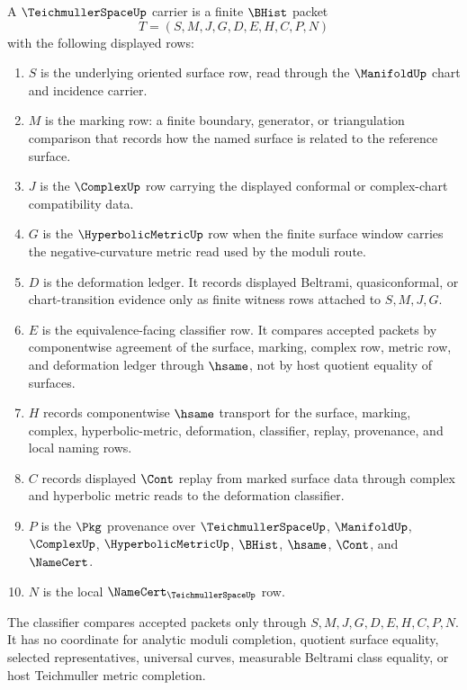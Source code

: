 \begin{definition}
\label{def:teichmuller-space-carrier}
A $\TeichmullerSpaceUp$ carrier is a finite $\BHist$ packet
$$
T=(S,M,J,G,D,E,H,C,P,N)
$$
with the following displayed rows:
\begin{enumerate}
\item $S$ is the underlying oriented surface row, read through the $\ManifoldUp$ chart and incidence carrier.
\item $M$ is the marking row: a finite boundary, generator, or triangulation comparison that records how the named surface is related to the reference surface.
\item $J$ is the $\ComplexUp$ row carrying the displayed conformal or complex-chart compatibility data.
\item $G$ is the $\HyperbolicMetricUp$ row when the finite surface window carries the negative-curvature metric read used by the moduli route.
\item $D$ is the deformation ledger. It records displayed Beltrami, quasiconformal, or chart-transition evidence only as finite witness rows attached to $S,M,J,G$.
\item $E$ is the equivalence-facing classifier row. It compares accepted packets by componentwise agreement of the surface, marking, complex row, metric row, and deformation ledger through $\hsame$, not by host quotient equality of surfaces.
\item $H$ records componentwise $\hsame$ transport for the surface, marking, complex, hyperbolic-metric, deformation, classifier, replay, provenance, and local naming rows.
\item $C$ records displayed $\Cont$ replay from marked surface data through complex and hyperbolic metric reads to the deformation classifier.
\item $P$ is the $\Pkg$ provenance over $\TeichmullerSpaceUp$, $\ManifoldUp$, $\ComplexUp$, $\HyperbolicMetricUp$, $\BHist$, $\hsame$, $\Cont$, and $\NameCert$.
\item $N$ is the local $\NameCert_{\TeichmullerSpaceUp}$ row.
\end{enumerate}
The classifier compares accepted packets only through $S,M,J,G,D,E,H,C,P,N$. It has no coordinate for analytic moduli completion, quotient surface equality, selected representatives, universal curves, measurable Beltrami class equality, or host Teichmuller metric completion.
\end{definition}


